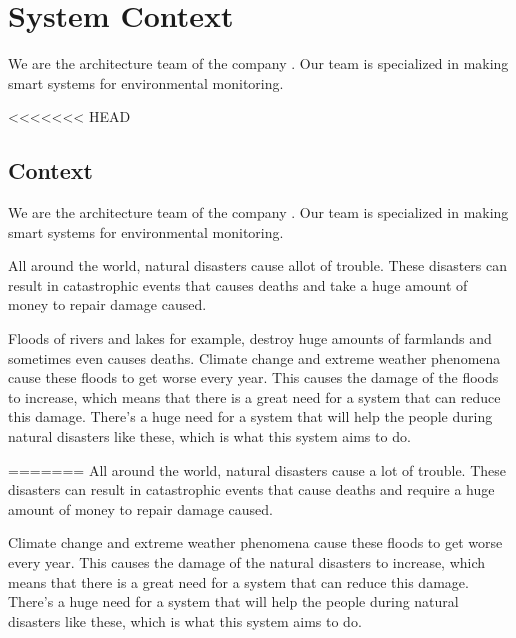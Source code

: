 \chapter{System Context}
\label{ch:context}

We are the architecture team of the company \CompanyName. Our team is specialized in making smart systems for environmental monitoring.

<<<<<<< HEAD
\section{Context}
We are the architecture team of the company \CompanyName. Our team is specialized in making smart systems for environmental monitoring.

All around the world, natural disasters cause allot of trouble. These disasters can result in catastrophic events that causes deaths and take a huge amount of money to repair damage caused.

Floods of rivers and lakes for example, destroy huge amounts of farmlands and sometimes even causes deaths. Climate change and extreme weather phenomena cause these floods to get worse every year. This causes the damage of the floods to increase, which means that there is a great need for a system that can reduce this damage. There's a huge need for a system that will help the people during natural disasters like these, which is what this system aims to do.


=======
All around the world, natural disasters cause a lot of trouble. These disasters can result in catastrophic events that cause deaths and require a huge amount of money to repair damage caused.

Climate change and extreme weather phenomena cause these floods to get worse every year. This causes the damage of the natural disasters to increase, which means that there is a great need for a system that can reduce this damage. There's a huge need for a system that will help the people during natural disasters like these, which is what this system aims to do.


